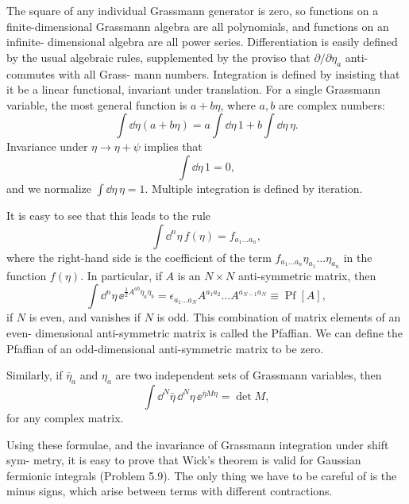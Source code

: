 The square of any individual Grassmann generator is zero, so functions on a
finite-dimensional Grassmann algebra are all polynomials, and functions on an infinite-
dimensional algebra are all power series. Differentiation is easily defined by the usual
algebraic rules, supplemented by the proviso that $\partial/\partial\eta_a$ anti-commutes with all Grass-
mann numbers. Integration is defined by insisting that it be a linear functional, invariant
under translation. For a single Grassmann variable, the most general function is $a+b\eta$,
where $a,b$ are complex numbers:
\begin{equation*}
  \int\dd\eta(a+b\eta)=a\int\dd\eta\,1+b\int\dd\eta\,\eta.
\end{equation*}
Invariance under $\eta\to\eta+\psi$ implies that
\begin{equation*}
  \int\dd\eta\,1=0,
\end{equation*}
and we normalize $\int\dd\eta\,\eta=1$. Multiple integration is defined by iteration.

It is easy to see that this leads to the rule
\begin{equation*}
  \int\dd^n\eta\,f(\eta)=f_{a_1\ldots a_n},
\end{equation*}
where the right-hand side is the coefficient of the term $f_{a_1\ldots a_n}\eta_{a_1}\ldots\eta_{a_n}$ in the function
$f(\eta)$. In particular, if $A$ is an $N\times N$ anti-symmetric matrix, then
\begin{equation*}
  \int\dd^n\eta\,\ee^{\frac12 A^{ab}\eta_a\eta_b}
  =\epsilon_{a_1\ldots a_N}A^{a_1a_2}\ldots A^{a_{N-1}a_N}
  \equiv\operatorname{Pf}[A],
\end{equation*}
if $N$ is even, and vanishes if $N$ is odd. This combination of matrix elements of an even-
dimensional anti-symmetric matrix is called the Pfaffian. We can define the Pfaffian of an
odd-dimensional anti-symmetric matrix to be zero.

Similarly, if $\bar\eta_a$ and $\eta_a$ are two independent sets of Grassmann variables, then
\begin{equation*}
  \int\dd^N\bar\eta\,\dd^N\eta\,\ee^{\bar\eta M\eta}=\det M,
\end{equation*}
for any complex matrix.


Using these formulae, and the invariance of Grassmann integration under shift sym-
metry, it is easy to prove that Wick’s theorem is valid for Gaussian fermionic integrals
(Problem 5.9). The only thing we have to be careful of is the minus signs, which arise
between terms with different contractions.
